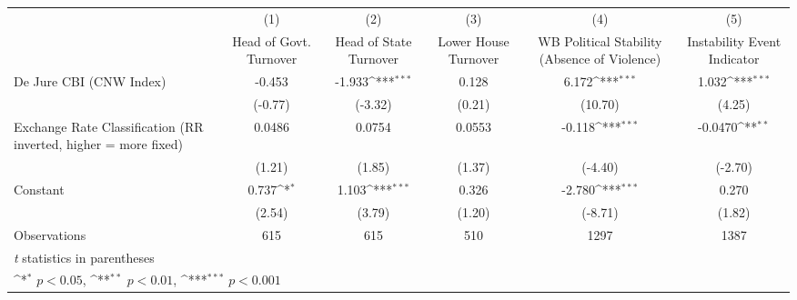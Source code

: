 {
\def\sym#1{\ifmmode^{#1}\else\(^{#1}\)\fi}
\begin{tabular}{l*{5}{c}}
\hline\hline
                &\multicolumn{1}{c}{(1)}&\multicolumn{1}{c}{(2)}&\multicolumn{1}{c}{(3)}&\multicolumn{1}{c}{(4)}&\multicolumn{1}{c}{(5)}\\
                &\multicolumn{1}{c}{Head of Govt. Turnover}&\multicolumn{1}{c}{Head of State Turnover}&\multicolumn{1}{c}{Lower House Turnover}&\multicolumn{1}{c}{WB Political Stability (Absence of Violence)}&\multicolumn{1}{c}{Instability Event Indicator}\\
\hline
De Jure CBI (CNW Index)&   -0.453         &   -1.933\sym{***}&    0.128         &    6.172\sym{***}&    1.032\sym{***}\\
                &  (-0.77)         &  (-3.32)         &   (0.21)         &  (10.70)         &   (4.25)         \\
[1em]
Exchange Rate Classification (RR inverted, higher = more fixed)&   0.0486         &   0.0754         &   0.0553         &   -0.118\sym{***}&  -0.0470\sym{**} \\
                &   (1.21)         &   (1.85)         &   (1.37)         &  (-4.40)         &  (-2.70)         \\
[1em]
Constant        &    0.737\sym{*}  &    1.103\sym{***}&    0.326         &   -2.780\sym{***}&    0.270         \\
                &   (2.54)         &   (3.79)         &   (1.20)         &  (-8.71)         &   (1.82)         \\
\hline
Observations    &      615         &      615         &      510         &     1297         &     1387         \\
\hline\hline
\multicolumn{6}{l}{\footnotesize \textit{t} statistics in parentheses}\\
\multicolumn{6}{l}{\footnotesize \sym{*} \(p<0.05\), \sym{**} \(p<0.01\), \sym{***} \(p<0.001\)}\\
\end{tabular}
}
